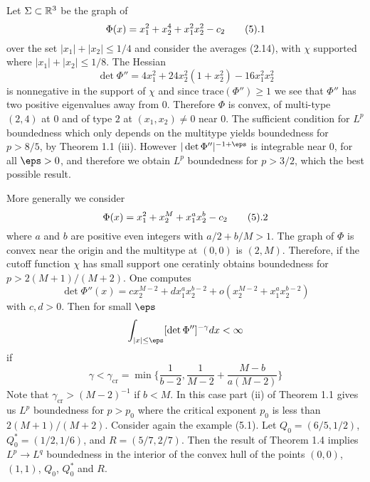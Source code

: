 Let $\Sigma\subset \Bbb R^3$ 
be the graph of
$$
\Phi(x)=x_1^2+x_2^4+x_1^2x_2^2-c_2
\tag 5.1
$$
over the set $|x_1|+|x_2|\le 1/4$
and consider the averages  (2.14), 
with $\chi$ supported where $|x_1|+|x_2|\le 1/8$.
The Hessian
$$\det \Phi''=4x_1^2+24 x^2_2(1+x_2^2)-16x_1^2x_2^2$$
is nonnegative in the support of $\chi$ 
and since $\text{trace}(\Phi'') \ge 1$ we see that
$\Phi''$  has two positive eigenvalues away from $0$. 
Therefore  $\Phi$ is convex, of multi-type $(2,4)$ at  $0$ and of type
$2$ at $(x_1,x_2)\neq 0$ near  $0$.
The sufficient condition for $L^p$ boundedness which only 
depends on the multitype yields boundedness  for $p>8/5$,
by Theorem 1.1 (iii).
However $|\det \Phi''|^{-1+\eps}$  is integrable near $0$, for
all $\eps>0$, and therefore we obtain $L^p$ boundedness for $p>3/2$, which 
the best possible result.


More generally we  consider
$$\Phi(x)= x_1^2+x_2^M+x_1^ax_2^b-c_2
\tag 5.2$$
where $a$ and $b$ are positive even integers
with $a/2+b/M>1$. The graph of $\Phi$ is convex near the origin and the
 multitype  at $(0,0)$ is $(2,M)$. 
Therefore, if the cutoff function $\chi$ has small support one
ceratinly  obtains boundedness for $p>2(M+1)/(M+2)$.
One computes
$$\det \Phi''(x) =c x_2^{M-2}+d x_1^ax_2^{b-2}+
o( x_2^{M-2}+ x_1^ax_2^{b-2})
$$
with $c,d>0$. Then for small $\eps$
$$\int_{|x|\le \eps} [\det\Phi'']^{-\gamma} dx<\infty
$$
if
$$\gamma<\gamma_{\text{cr}}=
\min\big\{\frac 1{b-2}, \frac 1{M-2}+\frac{M-b}{a(M-2)}\big\}
$$
Note that $\gamma_{\text{cr}}>(M-2)^{-1}$ if $b<M$. In this case
part (ii) of 
Theorem 1.1
gives us $L^p$ boundedness for
 $p>p_0$ where the critical exponent $p_0$ is less than
$2(M+1)/(M+2)$.                                                                 
Consider again the example (5.1).
Let $Q_0=(6/5, 1/2)$, $Q_0^*=(1/2, 1/6)$,
 and $R=(5/7, 2/7)$.
Then the result of Theorem 1.4 implies $L^p\to L^q$ boundedness in the interior
of the 
convex hull of the points $(0,0)$, $(1,1)$, $Q_0$, $Q_0^*$ and $R$.


